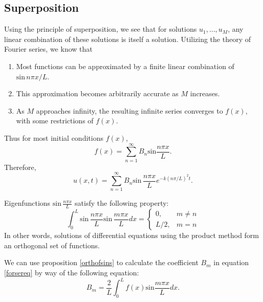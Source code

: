 \documentclass{article}
\begin{document}
\subsection{Superposition}
Using the principle of superposition, we see that for solutions \(u_1,\ldots,u_M\), any linear combination of these solutions is itself a solution. Utilizing the theory of Fourier series, we know that
\begin{enumerate}
	\item Most functions can be approximated by a finite linear combination of \(\text{sin}\,n\pi x/L\).
	\item This approximation becomes arbitrarily accurate as \(M\) increases.
	\item As \(M\) approaches infinity, the resulting infinite series converges to \(f(x)\), with some restrictions of \(f(x)\).
\end{enumerate}
Thus for most initial conditions \(f(x)\),
\begin{equation*}
	f(x)=\sum_{n=1}^{\infty}B_n\text{sin}\frac{n\pi x}{L}.
\end{equation*}
Therefore,
\begin{equation}
	\label{forsereq}
	u(x,t)=\sum_{n=1}^{\infty}B_n\text{sin}\,\frac{n\pi x}{L}e^{-k(n\pi/L)^2t}.
\end{equation}
\begin{proposition}
	\label{orthofsins}
	Eigenfunctions \(\text{sin}\,\frac{n\pi x}{L}\) satisfy the following property:
	\begin{equation*}
		\int_0^L\text{sin}\,\frac{n\pi x}{L}\text{sin}\,\frac{m\pi x}{L}dx=
		\begin{cases}
			0,&m\neq n\\L/2,&m=n
		\end{cases}
	\end{equation*}
	In other words, solutions of differential equations using the product method form an orthogonal set of functions.
\end{proposition}
\noindent We can use proposition \ref{orthofsins} to calculate the coefficient \(B_m\) in equation \ref{forsereq} by way of the following equation:
\begin{equation*}
	B_m=\frac{2}{L}\int_0^Lf(x)\text{sin}\frac{m\pi x}{L}dx.
\end{equation*}
\end{document}
